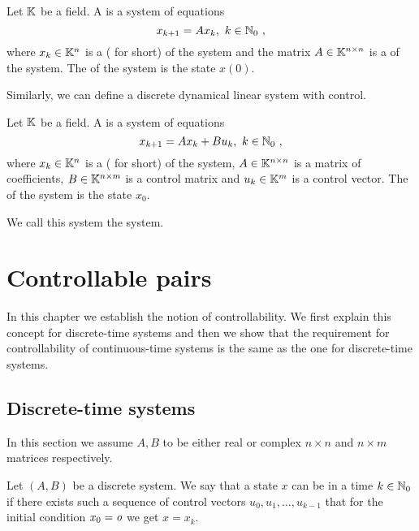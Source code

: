 \begin{definition}
	Let $\mathbb{K}$ be a field. A  is a system of equations
	$$x_{k+1}=Ax_k,\ k\in\N_0\ ,$$
	where $x_k\in \mathbb{K}^n$ is a  ( for short) of the system and the matrix $A\in \mathbb{K}^{n\times n}$ is a  of the system. The  of the system is the state $x(0)$.
\end{definition}

Similarly, we can define a discrete dynamical linear system with control.

\begin{definition}
	Let $\mathbb{K}$ be a field. A  is a system of equations
	$$x_{k+1}=Ax_k+Bu_k,\ k\in\N_0\ ,$$
	where $x_k\in\mathbb{K}^n$ is a  ( for short) of the system, $A\in\mathbb{K}^{n\times n}$ is a matrix of coefficients, $B\in\mathbb{K}^{n\times m}$ is a control matrix and $u_k\in\mathbb{K}^m$ is a control vector. The  of the system is the state $x_0$.

	We call this system the  system.
\end{definition}

\chapter{Controllable pairs}

In this chapter we establish the notion of controllability. We first explain this concept for discrete-time systems and then we show that the requirement for controllability of continuous-time systems is the same as the one for discrete-time systems.

\section{Discrete-time systems}

\begin{remark}
	In this section we assume $A,B$ to be either real or complex $n\times n$ and $n\times m$ matrices respectively.
\end{remark}

\begin{definition}
	Let $(A,B)$ be a discrete system. We say that a state $x$ can be  in a time $k\in\mathbb{N}_0$ if there exists such a sequence of control vectors $u_0,u_1,\ldots,u_{k-1}$ that for the initial condition $x_0=\textit{o}$ we get $x=x_k$.
\end{definition}

